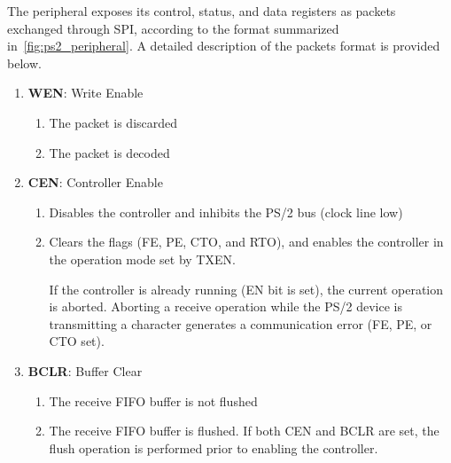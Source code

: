 The peripheral exposes its control, status, and data registers as packets exchanged through SPI, according to the format summarized in~\cref{fig:ps2_peripheral}. A detailed description of the packets format is provided below.
\begin{description}[style=nextline]
    \item[MOSI Packet]\hfill
    
        \begin{enumerate}[
            label=\emph{Bit \arabic*}, widest=s 15:8,
            left=\parindent, align=left,
            itemsep=2.5\itemsep,
            start=0
        ]
        \item \textbf{WEN}: Write Enable
        \begin{enumerate}[label=\arabic*:, start=0]
            \item The packet is discarded
            \item The packet is decoded
        \end{enumerate}
    
        \item \textbf{CEN}: Controller Enable
        \begin{enumerate}[label=\arabic*:, start=0]
            \item Disables the controller and inhibits the PS/2 bus (clock line low)
            \item Clears the flags (FE, PE, CTO, and RTO), and enables the controller in the operation mode set by TXEN.
            
            If the controller is already running (EN bit is set), the current operation is aborted. Aborting a receive operation while the PS/2 device is transmitting a character generates a communication error (FE, PE, or CTO set).
        \end{enumerate}
    
        \item \textbf{BCLR}: Buffer Clear
        \begin{enumerate}[label=\arabic*:, start=0]
            \item The receive FIFO buffer is not flushed
            \item The receive FIFO buffer is flushed. If both CEN and BCLR are set, the flush operation is performed prior to enabling the controller.
        \end{enumerate}
    
        \makeatletter
            \addtocounter{\@enumctr}{4}
        \makeatother
        

\end{enumerate}
\end{description}
